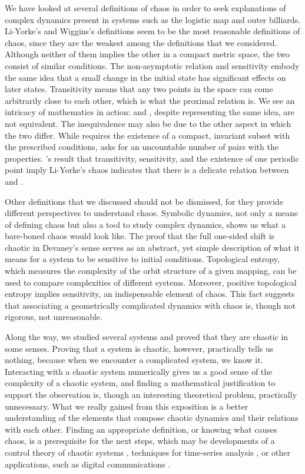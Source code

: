 \documentclass[10pt,twoside,draft]{book}
\begin{document}
We have looked at several definitions of chaos in order to seek explanations of complex dynamics present in systems such as the logistic map and outer billiards.
Li-Yorke's and Wiggins's definitions seem to be the most reasonable definitions of chaos, since they are the weakest among the definitions that we considered.
Although neither of them implies the other in a compact metric space, the two consist of similar conditions.
The non-asymptotic relation and sensitivity embody the same idea that a small change in the initial state has significant effects on later states.
Transitivity means that any two points in the space can come arbitrarily close to each other, which is what the proximal relation is.
We see an intricacy of mathematics in action: \wig and \liy, despite representing the same idea, are not equivalent.
The inequivalence may also be due to the other aspect in which the two differ.
While \wig requires the existence of a compact, invariant subset with the prescribed conditions, \liy asks for an uncountable number of pairs with the properties. 
\citet{mai}'s result that transitivity, sensitivity, and the existence of one periodic point imply Li-Yorke's chaos indicates that there is a delicate relation between \liy and \wig.


Other definitions that we discussed should not be dismissed, for they provide different perspectives to understand chaos.
Symbolic dynamics, not only a means of defining chaos but also a tool to study complex dynamics, shows us what a bare-boned chaos would look like.
The proof that the full one-sided shift is chaotic in Devaney's sense serves as an abstract, yet simple description of what it means for a system to be sensitive to initial conditions.
Topological entropy, which measures the complexity of the orbit structure of a given mapping, can be used to compare complexities of different systems.
Moreover, positive topological entropy implies sensitivity, an indispensable element of chaos.
This fact suggests that associating a geometrically complicated dynamics with chaos is, though not rigorous, not unreasonable.


Along the way, we studied several systems and proved that they are chaotic in some senses.
Proving that a system is chaotic, however, practically tells us nothing, because when we encounter a complicated system, we know it.
Interacting with a chaotic system numerically gives us a good sense of the complexity of a chaotic system, and finding a mathematical justification to support the observation is, though an interesting theoretical problem, practically unnecessary.
What we really gained from this exposition is a better understanding of the elements that compose chaotic dynamics and their relations with each other.
Finding an appropriate definition, or knowing what causes chaos, is a prerequisite for the next steps, which may be developments of a control theory of chaotic systems \citep{openproblems, chaos-frontiers}, techniques for time-series analysis \citep{kantz-schreiber, sprott, abarbanel}, or other applications, such as digital communications \citep{chaos-communication}.
\end{document}
